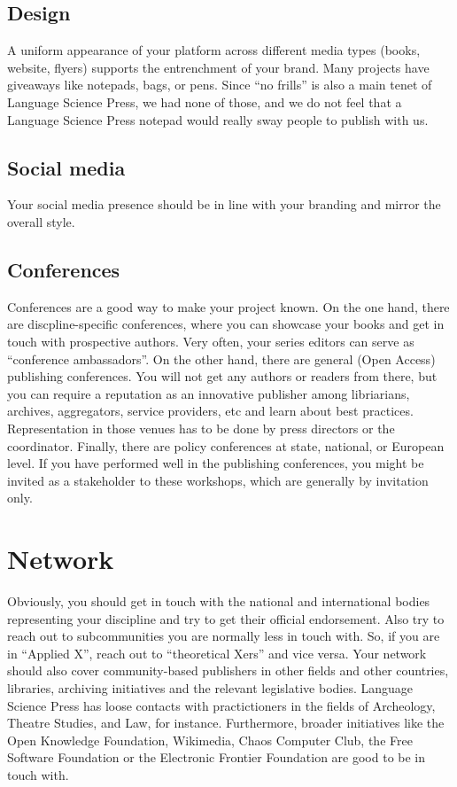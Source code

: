 \documentclass[nonflat,smallfont
]{langsci/langscibook}
\begin{document}
\subsection{Design}
A uniform appearance of your platform across different media types (books, website, flyers) supports the entrenchment of your brand. Many projects have giveaways like notepads, bags, or pens. Since  ``no frills'' is also a main tenet of Language Science Press, we had none of those, and we do not feel that a Language Science Press notepad would really sway people to publish with us. 

\subsection{Social media}
Your social media presence should be in line with your branding and mirror the overall style. 


\subsection{Conferences}
Conferences are a good way to make your project known. On the one hand, there are discpline-specific conferences, where you can showcase your books and get in touch with prospective authors. Very often, your series editors can serve as ``conference ambassadors''. On the other hand, there are general (Open Access) publishing conferences. You will not get any authors or readers from there, but you can require a reputation as an innovative publisher among libriarians, archives, aggregators, service providers, etc and learn about best practices. Representation in those venues has to be done by press directors or the coordinator. Finally, there are policy conferences at state, national, or  European level. If you have performed well in the publishing conferences, you might be invited as a stakeholder to these workshops, which are generally by invitation only. 

\section{Network}\label{sec:network}
Obviously, you should get in touch with the national and international bodies representing your discipline and try to get their official endorsement. Also try to reach out to subcommunities you are normally less in touch with. So, if you are in ``Applied X'', reach out to ``theoretical Xers'' and vice versa. Your network should also cover community-based publishers in other fields and other countries, libraries, archiving initiatives and the relevant legislative bodies. Language Science Press has loose contacts with practictioners in the fields of Archeology, Theatre Studies, and Law, for instance. 
Furthermore, broader initiatives like the Open Knowledge Foundation, Wikimedia, Chaos Computer Club, the Free Software Foundation or the Electronic Frontier Foundation are good to be in touch with.
\end{document}
